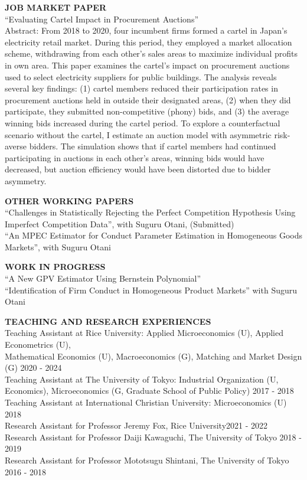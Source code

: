 \documentclass[10pt]{article}
\begin{document}
\textbf{JOB MARKET PAPER}\\
“Evaluating Cartel Impact in Procurement Auctions”\\
Abstract: From 2018 to 2020, four incumbent firms formed a cartel in Japan's electricity retail market. During this period, they employed a market allocation scheme, withdrawing from each other's sales areas to maximize individual profits in own area. 
This paper examines the cartel's impact on procurement auctions used to select electricity suppliers for public buildings.
The analysis reveals several key findings: (1) cartel members reduced their participation rates in procurement auctions held in outside their designated areas, (2) when they did participate, they submitted non-competitive (phony) bids, and (3) the average winning bids increased during the cartel period.   
To explore a counterfactual scenario without the cartel, I estimate an auction model with asymmetric risk-averse bidders. 
The simulation shows that if cartel members had continued participating in auctions in each other's areas, winning bids would have decreased, but auction efficiency would have been distorted due to bidder asymmetry.

\vspace{10pt}

\textbf{OTHER WORKING PAPERS} \\
“Challenges in Statistically Rejecting the Perfect Competition Hypothesis Using Imperfect Competition Data”, with Suguru Otani, (Submitted) \\
“An MPEC Estimator for Conduct Parameter Estimation in Homogeneous Goods Markets”, with Suguru Otani

\vspace{10pt}

\textbf{WORK IN PROGRESS} \\
“A New GPV Estimator Using Bernstein Polynomial” \\
“Identification of Firm Conduct in Homogeneous Product Markets” with Suguru Otani

\vspace{10pt}

\textbf{TEACHING AND RESEARCH EXPERIENCES} \\
Teaching Assistant at Rice University: Applied Microeconomics (U), Applied Econometrics (U),\\
Mathematical Economics (U), Macroeconomics (G), Matching and Market Design (G) \hfill 2020 - 2024\\
Teaching Assistant at The University of Tokyo: Industrial Organization (U, Economics), Microeconomics (G, Graduate School of Public Policy) \hfill  2017 - 2018\\
Teaching Assistant at International Christian University: Microeconomics (U) \hfill 2018\\
Research Assistant for Professor Jeremy Fox, Rice University\hfill 2021 - 2022\\
Research Assistant for Professor Daiji Kawaguchi, The University of Tokyo \hfill 2018 - 2019\\
Research Assistant for Professor Mototsugu Shintani, The University of Tokyo \hfill 2016 - 2018
\end{document}
